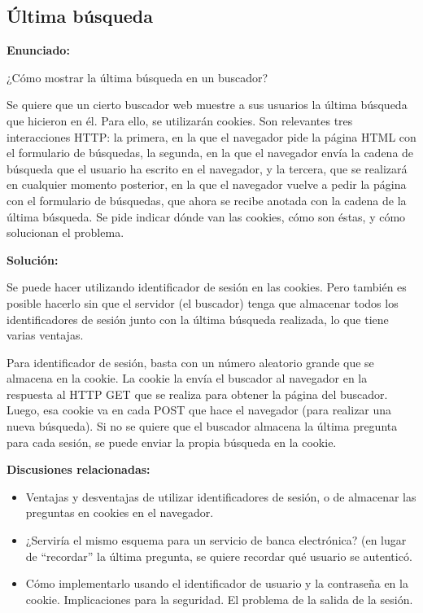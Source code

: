 \subsection{Última búsqueda}
\label{subsec:ultima-busqueda}

\textbf{Enunciado:}

¿Cómo mostrar la última búsqueda en un  buscador?

Se quiere que un cierto buscador web muestre a sus usuarios la última búsqueda que hicieron en él. Para ello, se utilizarán cookies. Son relevantes tres interacciones HTTP: la primera, en la que el navegador pide la página HTML con el formulario de búsquedas, la segunda, en la que el navegador envía la cadena de búsqueda que el usuario ha escrito en el navegador, y la tercera, que se realizará en cualquier momento posterior, en la que el navegador vuelve a pedir la página con el formulario de búsquedas, que ahora se recibe anotada con la cadena de la última búsqueda. Se pide indicar dónde van las cookies, cómo son éstas, y cómo solucionan el problema.

\textbf{Solución:}

Se puede hacer utilizando identificador de sesión en las cookies. Pero también es posible hacerlo sin que el servidor (el buscador) tenga que almacenar todos los identificadores de sesión  junto con la última búsqueda realizada, lo que tiene varias ventajas.

Para identificador de sesión, basta con un número aleatorio grande que se almacena en la cookie. La cookie la envía el buscador al navegador en la respuesta al HTTP GET que se realiza para obtener la página del buscador. Luego, esa cookie va en cada POST que hace el navegador (para realizar una nueva búsqueda). Si no se quiere que el buscador almacena la última pregunta para cada sesión, se puede enviar la propia búsqueda en la cookie.   

\textbf{Discusiones relacionadas:}

\begin{itemize}
\item Ventajas y desventajas de utilizar identificadores de sesión, o de almacenar las preguntas en cookies en el navegador.
\item ¿Serviría el mismo esquema para un servicio de banca electrónica? (en lugar de ``recordar'' la última pregunta, se quiere recordar qué usuario se autenticó.
\item Cómo implementarlo usando el identificador de usuario y la contraseña en la cookie. Implicaciones para la seguridad. El problema de la salida de la sesión.
\end{itemize}


